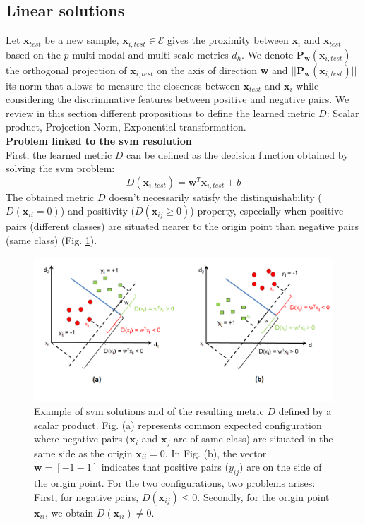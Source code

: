\subsection{Linear solutions}
Let $\textbf{x}_{test}$ be a new sample, $\textbf{x}_{i,test} \in \mathcal{E}$ gives the proximity between $\textbf{x}_{i}$ and $\textbf{x}_{test}$ based on the $p$ multi-modal and multi-scale metrics $d_h$. We denote $\textbf{P}_\textbf{w}(\textbf{x}_{i,test})$ the orthogonal projection of $\textbf{x}_{i,test}$ on the axis of direction \textbf{w} and $||\textbf{P}_\textbf{w}(\textbf{x}_{i,test})||$ its norm that allows to measure the closeness between $\textbf{x}_{test}$ and $\textbf{x}_{i}$ while considering the discriminative features between positive and negative pairs. We review in this section different propositions to define the learned metric $D$: Scalar product, Projection Norm, Exponential transformation. \\

\noindent \textbf{Problem linked to the {\sc svm} resolution} \\
First, the learned metric $D$ can be defined as the decision function obtained by solving the {\sc svm} problem:
\begin{equation}
D(\textbf{x}_{i,test}) = \textbf{w}^T\textbf{x}_{i,test} + b
\end{equation}
The obtained metric $D$ doesn't necessarily satisfy the distinguishability ($D(\textbf{x}_{ii}=0)$) and positivity ($D(\textbf{x}_{ij} \geq 0)$) property, especially when positive pairs (different classes) are situated nearer to the origin point than negative pairs (same class) (Fig. \ref{fig:Dissimilarity_def_scalar_product}).
\begin{figure}[h!]
\centering
\includegraphics[width=1\linewidth]{images/Dissimilarity_def_scalar_product}
\caption{Example of {\sc svm} solutions and of the resulting metric $D$ defined by a scalar product. Fig. (a) represents common expected configuration where negative pairs ($\textbf{x}_i$ and $\textbf{x}_j$ are of same class) are situated in the same side as the origin $\textbf{x}_{ii}=0$. In Fig. (b), the vector $\textbf{w}=[-1 -1]$ indicates that positive pairs ($y_{ij}$) are on the side of the origin point. For the two configurations, two problems arises: First, for negative pairs, $D(\textbf{x}_{ij}) \leq 0$. Secondly, for the origin point $\textbf{x}_{ii}$, we obtain $D(\textbf{x}_{ii}) \neq 0$.}
\label{fig:Dissimilarity_def_scalar_product}
\end{figure}


